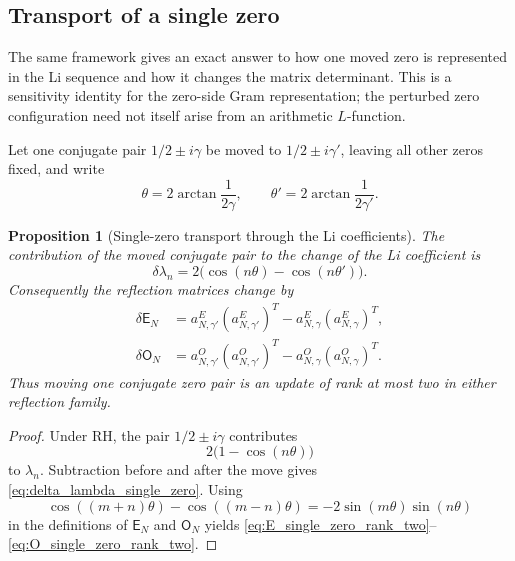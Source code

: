 \documentclass[preprint,12pt]{elsarticle}
\numberwithin{equation}{section}
\theoremstyle{plain}
\newtheorem{proposition}[theorem]{Proposition}
\theoremstyle{definition}
\theoremstyle{remark}
\newcommand{\RH}{\mathrm{RH}}
\newcommand{\E}{\mathsf E}
\newcommand{\Omat}{\mathsf O}
\begin{document}
\subsection{Transport of a single zero}

The same framework gives an exact answer to how one moved zero is represented in the Li sequence and how it changes the matrix determinant.  This is a sensitivity identity for the zero-side Gram representation; the perturbed zero configuration need not itself arise from an arithmetic $L$-function.

Let one conjugate pair $1/2\pm i\gamma$ be moved to $1/2\pm i\gamma'$, leaving all other zeros fixed, and write
\begin{equation}
\theta=2\arctan\frac{1}{2\gamma},
\qquad
\theta'=2\arctan\frac{1}{2\gamma'}.
\label{eq:theta_transport}
\end{equation}

\begin{proposition}[Single-zero transport through the Li coefficients]
\label{prop:single_zero_transport_Li}
The contribution of the moved conjugate pair to the change of the Li coefficient is
\begin{equation}
\boxed{
\delta\lambda_n
=2\bigl(\cos(n\theta)-\cos(n\theta')\bigr).}
\label{eq:delta_lambda_single_zero}
\end{equation}
Consequently the reflection matrices change by
\begin{align}
\delta\E_N
&=a_{N,\gamma'}^E(a_{N,\gamma'}^E)^T
-a_{N,\gamma}^E(a_{N,\gamma}^E)^T,
\label{eq:E_single_zero_rank_two}\\
\delta\Omat_N
&=a_{N,\gamma'}^O(a_{N,\gamma'}^O)^T
-a_{N,\gamma}^O(a_{N,\gamma}^O)^T.
\label{eq:O_single_zero_rank_two}
\end{align}
Thus moving one conjugate zero pair is an update of rank at most two in either reflection family.
\end{proposition}

\begin{proof}
Under $\RH$, the pair $1/2\pm i\gamma$ contributes
\begin{equation}
2\bigl(1-\cos(n\theta)\bigr)
\end{equation}
to $\lambda_n$.  Subtraction before and after the move gives \eqref{eq:delta_lambda_single_zero}.  Using
\begin{equation}
\cos((m+n)\theta)-\cos((m-n)\theta)
=-2\sin(m\theta)\sin(n\theta)
\end{equation}
in the definitions of $\E_N$ and $\Omat_N$ yields \eqref{eq:E_single_zero_rank_two}--\eqref{eq:O_single_zero_rank_two}.
\end{proof}
\end{document}
